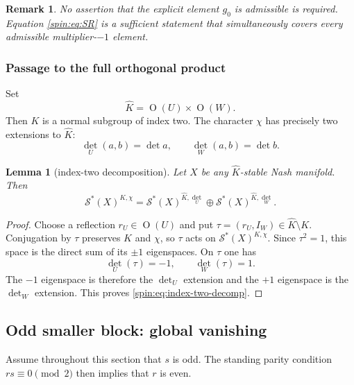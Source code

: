 \documentclass[10pt,a4paper]{amsart}
\numberwithin{equation}{section}
\newtheorem{lemma}[theorem]{Lemma}
\newtheorem{remark}[theorem]{Remark}
\newcommand{\Or}{\operatorname{O}}
\newcommand{\cS}{\mathcal S}
\begin{document}
\begin{remark}
No assertion that the explicit element $g_0$ is admissible is required.
Equation \eqref{spin:eq:SR} is a sufficient statement that simultaneously covers
every admissible multiplier-$-1$ element.
\end{remark}

\subsubsection{Passage to the full orthogonal product}

Set
\begin{equation}\label{spin:eq:Khat}
  \widehat K=\Or(U)\times\Or(W).
\end{equation}
Then $K$ is a normal subgroup of index two.  The character $\chi$ has precisely
two extensions to $\widehat K$:
\begin{equation}\label{spin:eq:det-extensions}
  \det_U(a,b)=\det a,
  \qquad
  \det_W(a,b)=\det b.
\end{equation}

\begin{lemma}[index-two decomposition]\label{spin:lem:index-two}
Let $X$ be any $\widehat K$-stable Nash manifold.  Then
\begin{equation}\label{spin:eq:index-two-decomp}
  \cS^*(X)^{K,\chi}
  =
  \cS^*(X)^{\widehat K,\det_U}
  \oplus
  \cS^*(X)^{\widehat K,\det_W}.
\end{equation}
\end{lemma}

\begin{proof}
Choose a reflection $r_U\in\Or(U)$ and put
$\tau=(r_U,I_W)\in\widehat K\setminus K$.  Conjugation by $\tau$ preserves
$K$ and $\chi$, so $\tau$ acts on $\cS^*(X)^{K,\chi}$.  Since $\tau^2=1$,
this space is the direct sum of its $\pm1$ eigenspaces.  On $\tau$ one has
\[
  \det_U(\tau)=-1,
  \qquad
  \det_W(\tau)=1.
\]
The $-1$ eigenspace is therefore the $\det_U$ extension and the $+1$
eigenspace is the $\det_W$ extension.  This proves
\eqref{spin:eq:index-two-decomp}.
\end{proof}

\subsection{Odd smaller block: global vanishing}\label{spin:sec:odd}

Assume throughout this section that $s$ is odd.  The standing parity condition
$rs\equiv0\pmod2$ then implies that $r$ is even.
\end{document}
